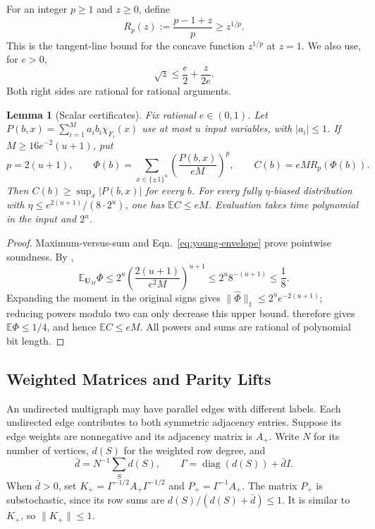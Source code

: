 \documentclass[letterpaper,11pt]{article}
\newtheorem{lemma}[theorem]{Lemma}
\theoremstyle{definition}
\newcommand{\E}{\mathbb E}
\newcommand{\U}{\mathbf U}
\DeclareMathOperator{\diag}{diag}
\begin{document}
For an integer $p\ge1$ and $z\ge0$, define
\begin{equation}
 R_p(z):=\frac{p-1+z}{p}\ge z^{1/p}.
 \label{eq:young-envelope}
\end{equation}
This is the tangent-line bound for the concave function $z^{1/p}$
at $z=1$. We also use, for $e>0$,
\begin{equation}
 \sqrt z\le\frac e2+\frac{z}{2e}.
 \label{eq:sqrt-envelope}
\end{equation}
Both right sides are rational for rational arguments.

\begin{lemma}[Scalar certificates]
\label{lem:scalar}
Fix rational $e\in(0,1)$. Let
$P(b,x)=\sum_{i=1}^M a_ib_i\chi_{F_i}(x)$ use at most $u$ input
variables, with $|a_i|\le1$. If
$M\ge16e^{-2}(u+1)$, put
\[
 p=2(u+1),\qquad
 \Phi(b)=\sum_{x\in\{\pm1\}^u}
          \left(\frac{P(b,x)}{eM}\right)^p,
 \qquad C(b)=eM R_p(\Phi(b)).
\]
Then $C(b)\ge\sup_x|P(b,x)|$ for every $b$. For every fully
$\eta$-biased distribution with
$\eta\le e^{2(u+1)}/(8\cdot2^u)$, one has $\E C\le eM$.
Evaluation takes time polynomial in the input and $2^u$.
\end{lemma}
\begin{proof}
Maximum-versus-sum and Eqn.~\eqref{eq:young-envelope} prove
pointwise soundness. By ,
\[
 \E_{\U_M}\Phi
 \le2^u\left(\frac{2(u+1)}{e^2M}\right)^{u+1}
 \le2^u8^{-(u+1)}\le\frac18.
\]
Expanding the moment in the original signs gives
$\|\widehat\Phi\|_1\le2^u e^{-2(u+1)}$; reducing powers
modulo two can only decrease this upper bound. 
therefore gives $\E\Phi\le1/4$, and hence $\E C\le eM$.
All powers and sums are rational of polynomial bit length.
\end{proof}

\subsection{Weighted Matrices and Parity Lifts}
An undirected multigraph may have parallel edges with different
labels. Each undirected edge contributes to both symmetric adjacency
entries. Suppose its edge weights are nonnegative and its adjacency
matrix is $A_+$. Write $N$ for its number of vertices, $d(S)$ for
the weighted row degree, and
\[
 \bar d=N^{-1}\sum_Sd(S),\qquad
 \Gamma=\diag(d(S))+\bar d I.
\]
When $\bar d>0$, set
$K_+=\Gamma^{-1/2}A_+\Gamma^{-1/2}$ and
$P_+=\Gamma^{-1}A_+$. The matrix $P_+$ is substochastic, since
its row sums are $d(S)/(d(S)+\bar d)\le1$. It is similar to
$K_+$, so $\|K_+\|\le1$.
\end{document}
